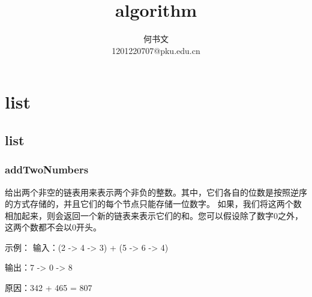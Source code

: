 \documentclass[oneside,12pt,twiside,a4paper]{ctexbook}
\begin{document}
\author
{
何书文\\
1201220707@pku.edu.cn\\
}

\title{algorithm}
\maketitle
\tableofcontents


\chapter{list}
\section{list}
\subsection{addTwoNumbers}
给出两个非空的链表用来表示两个非负的整数。其中，它们各自的位数是按照逆序的方式存储的，并且它们的每个节点只能存储一位数字。
如果，我们将这两个数相加起来，则会返回一个新的链表来表示它们的和。您可以假设除了数字0之外，这两个数都不会以0开头。

示例：
输入：(2 -> 4 -> 3) + (5 -> 6 -> 4)

输出：7 -> 0 -> 8

原因：342 + 465 = 807
\end{document}
